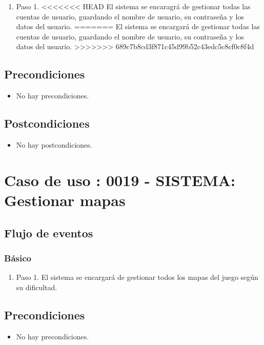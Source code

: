 \begin{enumerate}
\item Paso 1.
<<<<<<< HEAD
El sistema se encaragrá de gestionar todas las cuentas de usuario, guardando el nombre de usuario, su contraseña y los datos del usuario.
=======
El sistema se encargará de gestionar todas las cuentas de usuario, guardando el nombre de usuario, su contraseña y los datos del usuario.
>>>>>>> 689c7b8cd3f871c45d99b52c43edc5c8cf0c8f4d
\end{enumerate}

\subsection{Precondiciones}
\begin{itemize}
\item No hay precondiciones.
\end{itemize}

\subsection{Postcondiciones}
\begin{itemize}
\item No hay postcondiciones.
\end{itemize}



\section{Caso de uso : 0019 - SISTEMA: Gestionar mapas}\label{sec:uc0}
\subsection{Flujo de eventos}
\subsubsection{Básico}

\begin{enumerate}
\item Paso 1.
El sistema se encargará de gestionar todos los mapas del juego según su dificultad.
\end{enumerate}

\subsection{Precondiciones}
\begin{itemize}
\item No hay precondiciones.
\end{itemize}

